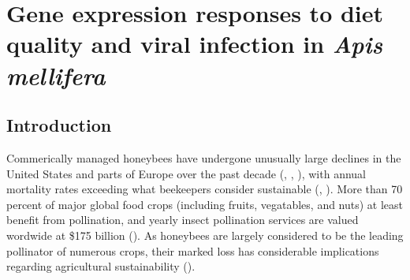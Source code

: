 \documentclass[11pt,a4paper,oldfontcommands,openany]{memoir}
\numberwithin{equation}{section} %
\begin{document}
\sloppy


% 
% 
% 
% 
% 
% 
% 
% 
% 
% 
% 
% 
% 
% 
% 
% 
% 
% 
% 
% 
% 

\setsecheadstyle{\Large\bfseries\sffamily\raggedright}
\setsubsecheadstyle{\large\bfseries\sffamily\raggedright}
\setsubsubsecheadstyle{\bfseries\sffamily\raggedright}


\setlength{\parskip}{10pt} %

\OnehalfSpacing

\chapter{Gene expression responses to diet quality and viral infection in \textit{Apis mellifera}}

\section{Introduction}

Commerically managed honeybees have undergone unusually large declines in the United States and parts of Europe over the past decade (\citealt{ccd1}, \citealt{ccd2}, \citealt{ccd3}), with annual mortality rates exceeding what beekeepers consider sustainable (\citealt{ccd5}, \citealt{ccd6}). More than 70 percent of major global food crops (including fruits, vegatables, and nuts) at least benefit from pollination, and yearly insect pollination services are valued wordwide at \$175 billion (\citealt{ccd7}). As honeybees are largely considered to be the leading pollinator of numerous crops, their marked loss has considerable implications regarding agricultural sustainability (\citealt{ccd4}).
\end{document}
